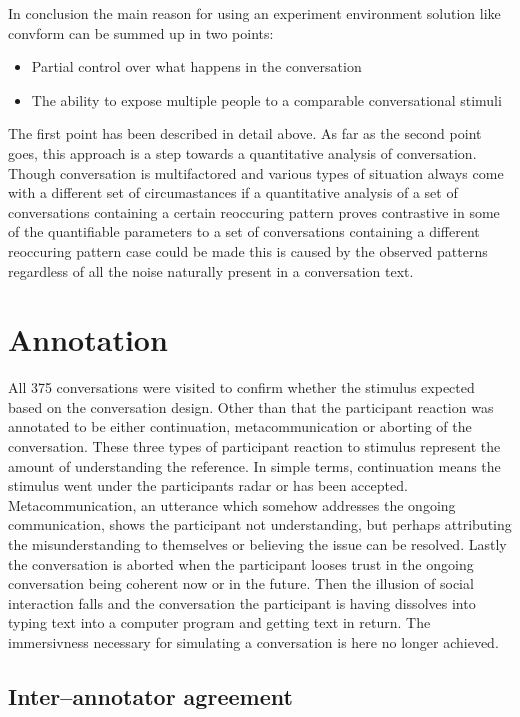 \documentclass[12pt]{report}
\begin{document}
{In conclusion the main reason for using
an experiment environment solution like convform
can be summed up in two points:

\begin{itemize}
\item{Partial control over what happens in the conversation}
\item{The ability to expose multiple people to a comparable conversational stimuli}
\end{itemize}

The first point has been described in detail above.
As far as the second point goes,
this approach is a step towards
a quantitative analysis of conversation.
Though conversation is multifactored
and various types of situation
always come with a different set of circumastances
if a quantitative analysis of a set of conversations
containing a certain reoccuring pattern
proves contrastive in some of the quantifiable parameters
to a set of conversations containing a different reoccuring pattern
case could be made this is caused by the observed patterns
regardless of all the noise naturally present in a conversation text.

\section{Annotation}

All 375 conversations were visited to confirm whether
the stimulus expected based on the conversation design.
Other than that the participant reaction was annotated to be either
continuation, metacommunication or aborting of the conversation.
These three types of participant reaction to stimulus
represent the amount of understanding the reference.
In simple terms, continuation means
the stimulus went under the participants radar
or has been accepted.
Metacommunication, an utterance which somehow addresses the ongoing communication,
shows the participant not understanding,
but perhaps attributing the misunderstanding to themselves or
believing the issue can be resolved.
Lastly the conversation is aborted when the participant looses trust
in the ongoing conversation being coherent now or in the future.
Then the illusion of social interaction falls
and the conversation the participant is having dissolves into
typing text into a computer program and getting text in return.
The immersivness necessary for simulating a conversation is here no longer achieved.

\subsection{Inter--annotator agreement}

}
\end{document}
